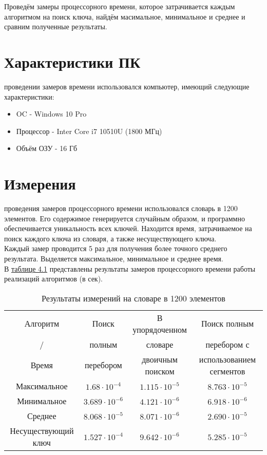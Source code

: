 Проведём замеры процессорного времени, которое затрачивается каждым алгоритмом на поиск ключа, найдём масимальное, минимальное и среднее и сравним полученные результаты.

\section{Характеристики ПК}
 проведении замеров времени использовался компьютер, имеющий следующие характеристики:
\begin{itemize}
	\item OC - Windows 10 Pro
	\item Процессор - Inter Core i7 10510U (1800 МГц)
	\item Объём ОЗУ - 16 Гб
\end{itemize}

\section{Измерения}
 проведения замеров процессорного времени использовался словарь в 1200 элементов. Его содержимое генерируется случайным образом, и программно обеспечивается уникальность всех ключей. Находится время, затрачиваемое на поиск каждого ключа из словаря, а также несуществующего ключа. \\

Каждый замер проводится 5 раз для получения более точного среднего результата. Выделяется максимальное, минимальное и среднее время.\\

В \hyperref[table_4_1]{таблице 4.1} представлены результаты замеров процессорного времени работы реализаций алгоритмов (в сек).

\begin{table}[ph] \label{table_4_1}
	\caption{Результаты измерений на словаре в 1200 элементов}
	\centering
	\begin{tabular}{|c|c|c|c|}
		\hline
		Алгоритм &Поиск & В упорядоченном & Поиск полным\\
		/    &полным &словаре &перебором с\\
		Время    &перебором &двоичным поиском &использованием сегментов \\
		\hline
		Максимальное & $1.68\cdot10^{-4}$ & $1.115\cdot10^{-5}$ & $8.763\cdot10^{-5}$ \\
		\hline
		Минимальное & $3.689\cdot10^{-6}$ & $4.121\cdot10^{-6}$ & $6.918\cdot10^{-6}$ \\
		\hline
		Среднее & $8.068\cdot10^{-5}$ & $8.071\cdot10^{-6}$ & $2.690\cdot10^{-5}$ \\
		\hline
		Несуществующий ключ & $1.527\cdot10^{-4}$ & $9.642\cdot10^{-6}$ & $5.285\cdot10^{-5}$ \\
		\hline
	\end{tabular}
\end{table}

